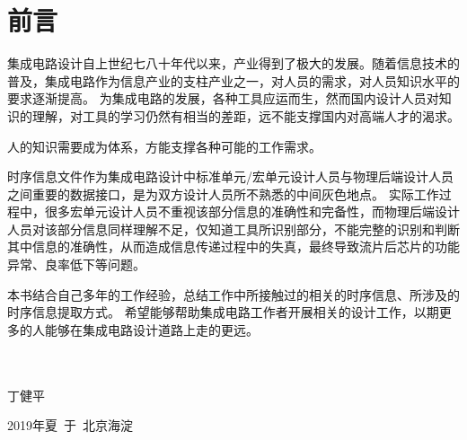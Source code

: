 \section{前言\label{preface}}

集成电路设计自上世纪七八十年代以来，产业得到了极大的发展。随着信息技术的普及，集成电路作为信息产业的支柱产业之一，对人员的需求，对人员知识水平的要求逐渐提高。
为集成电路的发展，各种工具应运而生，然而国内设计人员对知识的理解，对工具的学习仍然有相当的差距，远不能支撑国内对高端人才的渴求。

人的知识需要成为体系，方能支撑各种可能的工作需求。

时序信息文件作为集成电路设计中标准单元/宏单元设计人员与物理后端设计人员之间重要的数据接口，是为双方设计人员所不熟悉的中间灰色地点。
实际工作过程中，很多宏单元设计人员不重视该部分信息的准确性和完备性，而物理后端设计人员对该部分信息同样理解不足，仅知道工具所识别部分，不能完整的识别和判断其中信息的准确性，从而造成信息传递过程中的失真，最终导致流片后芯片的功能异常、良率低下等问题。

本书结合自己多年的工作经验，总结工作中所接触过的相关的时序信息、所涉及的时序信息提取方式。
希望能够帮助集成电路工作者开展相关的设计工作，以期更多的人能够在集成电路设计道路上走的更远。

~\\

~\\

\hfill 丁健平

\hfill 2019年夏\ 于\ 北京海淀
